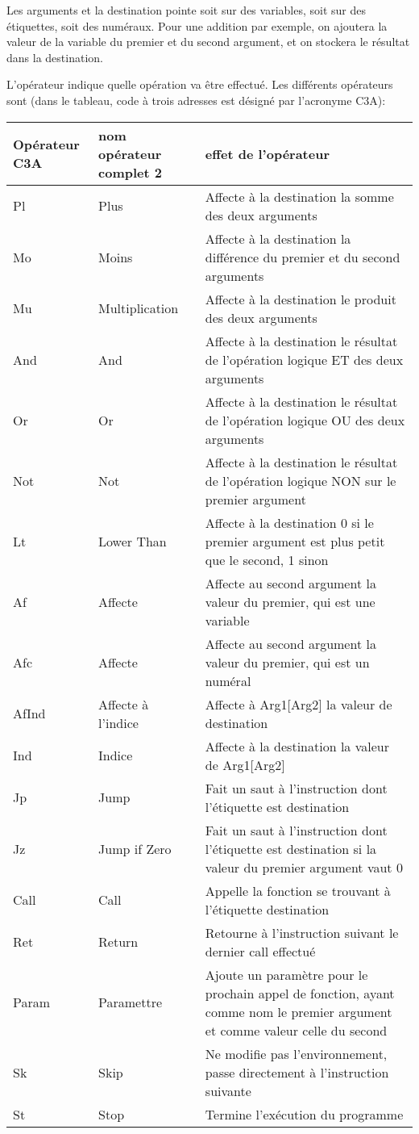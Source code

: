 \documentclass{article}
\begin{document}
Les arguments et la destination pointe soit sur des variables, soit sur des étiquettes, soit des numéraux. Pour une addition par exemple, on ajoutera la valeur de la variable du premier et du second argument, et on stockera le résultat dans la destination.

L'opérateur indique quelle opération va être effectué. Les différents opérateurs sont (dans le tableau, code à trois adresses est désigné par l'acronyme C3A):

\begin{tabular}{|p{1.5cm}|p{2cm}|p{7cm}|}
  \hline
  Opérateur C3A & nom opérateur complet 2 & effet de l'opérateur \\
  \hline
  \hline
  Pl & Plus & Affecte à la destination la somme des deux arguments \\  \hline
  Mo & Moins & Affecte à la destination la différence du premier et du second arguments \\  \hline
  Mu & Multiplication & Affecte à la destination le produit des deux arguments \\  \hline
  And & And & Affecte à la destination le résultat de l'opération logique ET des deux arguments \\  \hline
  Or & Or & Affecte à la destination le résultat de l'opération logique OU des deux arguments \\  \hline
  Not & Not & Affecte à la destination le résultat de l'opération logique NON sur le premier argument \\  \hline
  Lt & Lower Than & Affecte à la destination 0 si le premier argument est plus petit que le second, 1 sinon\\  \hline
  Af & Affecte & Affecte au second argument la valeur du premier, qui est une variable\\  \hline
  Afc & Affecte & Affecte au second argument la valeur du premier, qui est un numéral\\  \hline
  AfInd & Affecte à l'indice & Affecte à Arg1[Arg2] la valeur de destination\\  \hline
  Ind & Indice & Affecte à la destination la valeur de Arg1[Arg2]\\  \hline
  Jp & Jump & Fait un saut à l'instruction dont l’étiquette est destination\\  \hline
  Jz & Jump if Zero & Fait un saut à l'instruction dont l’étiquette est destination si la valeur du premier argument vaut 0\\  \hline
  Call & Call & Appelle la fonction se trouvant à l'étiquette destination\\  \hline
  Ret & Return & Retourne à l'instruction suivant le dernier call effectué\\  \hline
  Param & Paramettre & Ajoute un paramètre pour le prochain appel de fonction, ayant comme nom le premier argument et comme valeur celle du second\\  \hline
  Sk & Skip & Ne modifie pas l'environnement, passe directement à l'instruction suivante\\  \hline
  St & Stop & Termine l'exécution du programme\\  \hline
\end{tabular}
\end{document}
